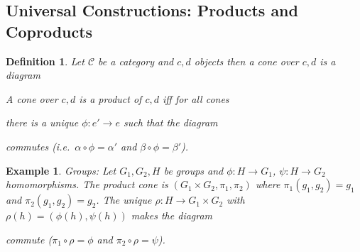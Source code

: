 \documentclass[a4paper,12pt]{article}
\newtheorem{defn}[thm]{Definition}
\newtheorem{eg}[thm]{Example}
\begin{document}
\subsection{Universal Constructions: Products and Coproducts}
\begin{defn}
    Let $\mathcal{C}$ be a category and $c,d$ objects then a cone over $c,d$ is a diagram
    \begin{center}
    \end{center}
    A cone over $c,d$ is a product of $c,d$ iff for all cones 
    \begin{center}
    \end{center}
    there is a unique $\phi: e' \to e$ such that the diagram
    \begin{center}
    \end{center}
    commutes (i.e.\ $\alpha \circ \phi = \alpha'$ and $\beta \circ \phi = \beta'$). 
\end{defn}
\begin{eg}
    Groups: Let $G_1,G_2,H$ be groups and $\phi:H\to G_1$, $\psi:H\to G_2$ homomorphisms. The product cone is $(G_1\times G_2, \pi_1, \pi_2)$ where $\pi_1(g_1,g_2)=g_1$ and $\pi_2(g_1,g_2)=g_2$. The unique $\rho:H\to G_1\times G_2$ with $\rho(h)=(\phi(h),\psi(h))$ makes the diagram
    \begin{center}
    \end{center}
    commute ($\pi_1\circ\rho=\phi$ and $\pi_2\circ\rho=\psi$).
\end{eg}
\end{document}
